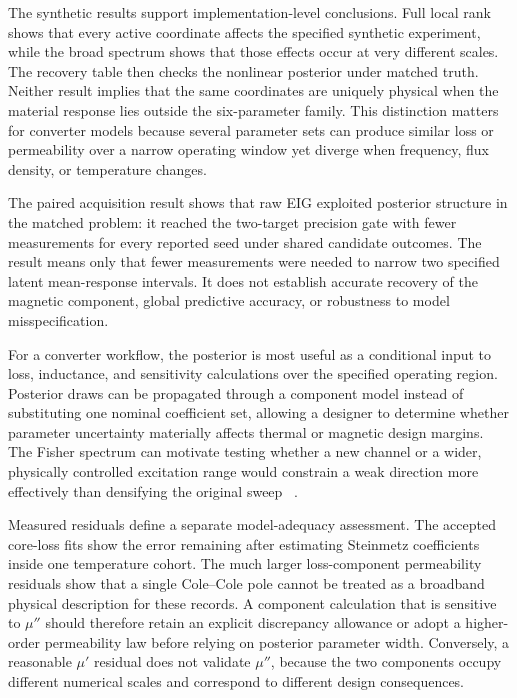 \documentclass[10pt,a4paper,twocolumn]{article}
\makeatletter
\renewcommand\subsection{\@startsection{subsection}{2}{0pt}{1ex plus .2ex}{.35ex}{\normalsize\bfseries}}
\makeatother
\begin{document}
The synthetic results support implementation-level conclusions. Full local
rank shows that every active coordinate affects the specified synthetic
experiment, while the broad spectrum shows that those effects occur at very
different scales. The recovery table then checks the nonlinear posterior under
matched truth. Neither result implies that the same coordinates are uniquely
physical when the material response lies outside the six-parameter family.
This distinction matters for converter models because several parameter sets
can produce similar loss or permeability over a narrow operating window yet
diverge when frequency, flux density, or temperature changes.

The paired acquisition result shows that raw EIG exploited posterior structure
in the matched problem: it reached the two-target precision gate with fewer
measurements for every reported seed under shared candidate outcomes. The
result means only that fewer measurements were needed to narrow two specified
latent mean-response intervals. It does not establish accurate recovery of the
magnetic component, global predictive accuracy, or robustness to model
misspecification.

\subsection{Implications for converter modeling}
For a converter workflow, the posterior is most useful as a conditional input
to loss, inductance, and sensitivity calculations over the specified
operating region. Posterior draws can be propagated through a component model
instead of substituting one nominal coefficient set, allowing a designer to
determine whether parameter uncertainty materially affects thermal or magnetic
design margins. The Fisher spectrum can motivate testing whether a new channel
or a wider, physically controlled excitation range would constrain a weak
direction more effectively than densifying the original sweep
~\cite{chaloner1995,atkinson2007}.

Measured residuals define a separate model-adequacy assessment. The accepted core-loss
fits show the error remaining after estimating Steinmetz coefficients inside
one temperature cohort. The much larger loss-component permeability residuals
show that a single Cole--Cole pole cannot be treated as a broadband physical
description for these records. A component calculation that is sensitive to
$\mu''$ should therefore retain an explicit discrepancy allowance or adopt a
higher-order permeability law before relying on posterior parameter width.
Conversely, a reasonable $\mu'$ residual does not validate $\mu''$, because
the two components occupy different numerical scales and correspond to
different design consequences.
\end{document}
